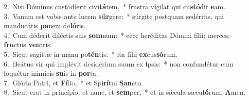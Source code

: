 {2.~}Nisi Dóminus custodíerit civi\textbf{tá}tem,~* frustra vígilat qui cu\textbf{stó}dit \textbf{e}am.\\
{3.~}Vanum est vobis ante lucem \textbf{súr}gere:~* súrgite postquam sedéritis, qui manducátis \textbf{pa}nem do\textbf{ló}ris.\\
{4.~}Cum déderit diléctis suis \textbf{som}num:~* ecce heréditas Dómini fílii: merces, \textbf{fru}ctus \textbf{ven}tris.\\
{5.~}Sicut sagíttæ in manu po\textbf{tén}tis:~* ita fílii \textbf{ex}cus\textbf{só}rum.\\
{6.~}Beátus vir qui implévit desidérium suum ex \textbf{i}psis:~* non confundétur cum loquétur inimícis \textbf{su}is in \textbf{por}ta.\\
{7.~}Glória Patri, et \textbf{Fí}lio,~* et Spi\textbf{rí}tui \textbf{San}cto.\\
{8.~}Sicut erat in princípio, et nunc, et \textbf{sem}per,~* et in sǽcula sæcu\textbf{ló}rum. \textbf{A}men.\\
